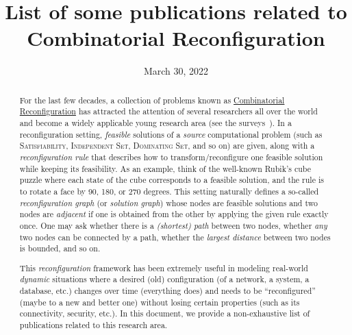 \documentclass[a4paper]{article}
\title{List of some publications related to Combinatorial Reconfiguration}
\date{March 30, 2022}
\begin{document}
	\nocite{*}
	
	\maketitle
	
	\begin{abstract}
		For the last few decades, a collection of problems known as \href{https://en.wikipedia.org/wiki/Reconfiguration}{Combinatorial Reconfiguration} has attracted the attention of several researchers all over the world and become a widely applicable young research area (see the surveys~\cite{books/cu/p/Heuvel13,journals/algorithms/Nishimura18,conf/seiccgtc/MynhardtN19}).
		In a reconfiguration setting, \textit{feasible} solutions of a \textit{source} computational problem (such as \textsc{Satisfiability}, \textsc{Independent Set}, \textsc{Dominating Set}, and so on) are given, along with a \textit{reconfiguration rule} that describes how to transform/reconfigure one feasible solution while keeping its feasibility.
		As an example, think of the well-known Rubik's cube puzzle where each state of the cube corresponds to a feasible solution, and the rule is to rotate a face by 90, 180, or 270 degrees.
		This setting naturally defines a so-called \textit{reconfiguration graph} (or \textit{solution graph}) whose nodes are feasible solutions and two nodes are \textit{adjacent} if one is obtained from the other by applying the given rule exactly once.
		One may ask whether there is a \textit{(shortest) path} between two nodes, whether \textit{any} two nodes can be connected by a path, whether the \textit{largest distance} between two nodes is bounded, and so on.
		
		This \textit{reconfiguration} framework has been extremely useful in modeling real-world \textit{dynamic} situations where a desired (old) configuration (of a network, a system, a database, etc.) changes over time (everything does) and needs to be ``reconfigured'' (maybe to a new and better one) without losing certain properties (such as its connectivity, security, etc.).
		In this document, we provide a non-exhaustive list of publications related to this research area.
	\end{abstract}
	
	\clearpage
	
	\tableofcontents
	
	\clearpage
	
 	\printbibbyyear
\end{document}
